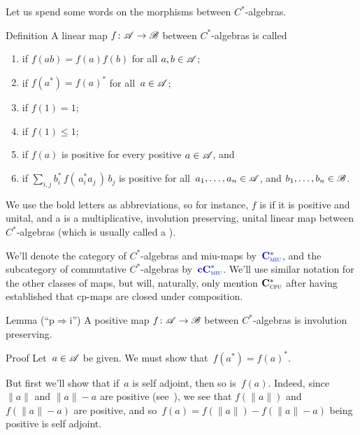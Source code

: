 \documentclass[a]{subfiles}
\begin{document}
\begin{parsec}%
\begin{point}%
Let us spend some words
on the morphisms between $C^*$-algebras.
\end{point}
\begin{point}[maps]{Definition}
A linear map $f\colon \mathscr{A} \to \mathscr{B}$
between $C^*$-algebras
is called
\begin{enumerate}
\item
{}
if $f(ab)=f(a)f(b)$ for all $a,b\in\mathscr{A}$;
\item
{}
if $f(a^*)=f(a)^*$ for all~$a\in\mathscr{A}$;
\item
{}
if $f(1)=1$;
\item
{}
if $f(1)\leq 1$;
\item
{}
if $f(a)$ is positive
for every positive $a\in\mathscr{A}$, and
\item
{}
if $\sum_{i,j} b_i^*\,f(\,a_i^*a_j\,)\,b_j$ is positive
for all~$a_1,\dotsc,a_n\in \mathscr{A}$, and $b_1,\dotsc,b_n\in\mathscr{B}$.
\end{enumerate}
\begin{point}%
We use the bold letters as abbreviations,
so for instance,
$f$ is  if it is positive and unital,
and a 
is a multiplicative, involution preserving,
unital linear map between $C^*$-algebras
(which is usually called a ).

We'll denote the category of $C^*$-algebras
and miu-maps by~$\Define{\Cstar{miu}}$,
and
the subcategory of commutative $C^*$-algebras
by~$\Define{\cCstar{miu}}$.
We'll use similar notation
for the other classes of maps,
but
will,
naturally, only mention $\mathbf{C}^*_{\text{\textsc{cpu}}}$
after having established that cp-maps are closed under composition.
\end{point}
\end{point}
\begin{point}{Lemma (``p$\Rightarrow$i'')}
A positive map $f\colon \mathscr{A}\to\mathscr{B}$ between
$C^*$-algebras is involution preserving.
\begin{point}{Proof}%
Let~$a\in \mathscr{A}$ be given. We must show that~$f(a^*)=f(a)^*$.

But first we'll show that if~$a$ is self adjoint,
then so is~$f(a)$.
Indeed, since $\|a\|$ and $\|a\|-a$ are positive (see~),
we see that $f(\|a\|)$ and $f(\|a\|-a)$ are positive,
and so~$f(a)=f(\|a\|)-f(\|a\|-a)$ being positive is self adjoint.


\end{point}
\end{point}
\end{parsec}
\end{document}
